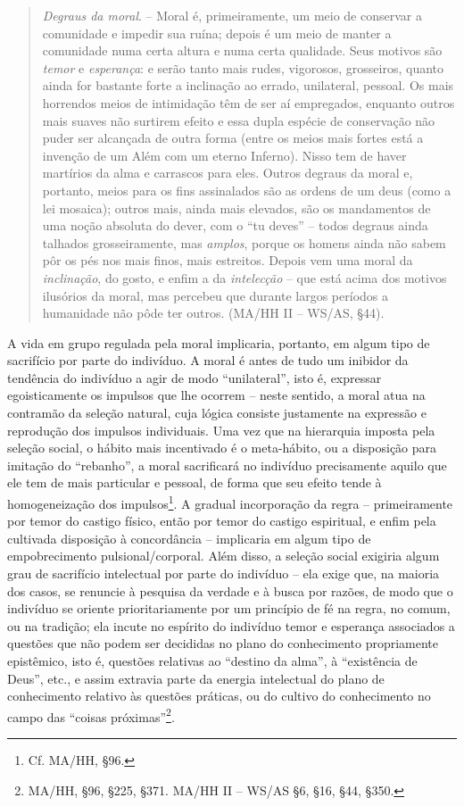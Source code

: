 \documentclass[
	12pt,				%
	openright,			%
	oneside,			%
	a4paper,			%
	english,			%
	french,				%
	spanish,			%
	brazil				%
	]{abntex2}
\begin{document}
\begin{quotation}
\textit{Degraus da moral}. – Moral é, primeiramente, um meio de conservar a comunidade e impedir sua ruína; depois é um meio de manter a comunidade numa certa altura e numa certa qualidade. Seus motivos são \textit{temor} e \textit{esperança}: e serão tanto mais rudes, vigorosos, grosseiros, quanto ainda for bastante forte a inclinação ao errado, unilateral, pessoal. Os mais horrendos meios de intimidação têm de ser aí empregados, enquanto outros mais suaves não surtirem efeito e essa dupla espécie de conservação não puder ser alcançada de outra forma (entre os meios mais fortes está a invenção de um Além com um eterno Inferno). Nisso tem de haver martírios da alma e carrascos para eles. Outros degraus da moral e, portanto, meios para os fins assinalados são as ordens de um deus (como a lei mosaica); outros mais, ainda mais elevados, são os mandamentos de uma noção absoluta do dever, com o “tu deves” – todos degraus ainda talhados grosseiramente, mas \textit{amplos}, porque os homens ainda não sabem pôr os pés nos mais finos, mais estreitos. Depois vem uma moral da \textit{inclinação}, do gosto, e enfim a da \textit{intelecção} – que está acima dos motivos ilusórios da moral, mas percebeu que durante largos períodos a humanidade não pôde ter outros.  (MA/HH II – WS/AS, §44).
\end{quotation}

A vida em grupo regulada pela moral implicaria, portanto, em algum tipo de sacrifício por parte do indivíduo. A moral é antes de tudo um inibidor da tendência do indivíduo a agir de modo “unilateral”, isto é, expressar egoisticamente os impulsos que lhe ocorrem – neste sentido, a moral atua na contramão da seleção natural, cuja lógica consiste justamente na expressão e reprodução dos impulsos individuais. Uma vez que na hierarquia imposta pela seleção social, o hábito mais incentivado é o meta-hábito, ou a disposição para imitação do “rebanho”, a moral sacrificará no indivíduo precisamente aquilo que ele tem de mais particular e pessoal, de forma que seu efeito tende à homogeneização dos impulsos\footnote{Cf. MA/HH, §96.}. A gradual incorporação da regra – primeiramente por temor do castigo físico, então por temor do castigo espiritual, e enfim pela cultivada disposição à concordância – implicaria em algum tipo de empobrecimento pulsional/corporal. Além disso, a seleção social exigiria algum grau de sacrifício intelectual por parte do indivíduo – ela exige que, na maioria dos casos, se renuncie à pesquisa da verdade e à busca por razões, de modo que o indivíduo se oriente prioritariamente por um princípio de fé na regra, no comum, ou na tradição; ela incute no espírito do indivíduo temor e esperança associados a questões que não podem ser decididas no plano do conhecimento propriamente epistêmico, isto é, questões relativas ao “destino da alma”, à “existência de Deus”, etc., e assim extravia parte da energia intelectual do plano de conhecimento relativo às questões práticas, ou do cultivo do conhecimento no campo das “coisas próximas”\footnote{MA/HH, §96, §225, §371. MA/HH II – WS/AS §6, §16, §44, §350.}.
\end{document}
